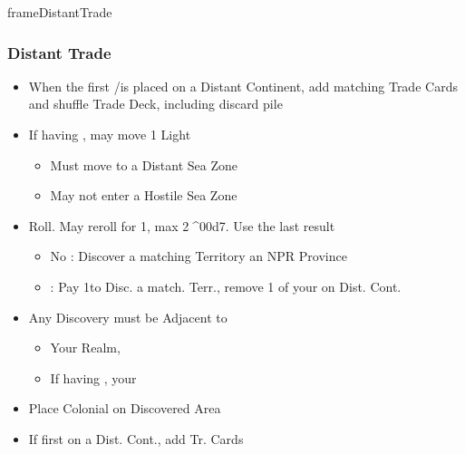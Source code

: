 \documentclass[10pt]{article}
\newlength{\fhDistantTrade} \setlength\fhDistantTrade{4\baselineskip}
\begin{document}
\begin{dynamiccontents*}{frameDistantTrade}\begin{eubox}{\fhDistantTrade}
	\subsubsection*{Distant Trade }
	\begin{itemize}
		\item When the first \claim/\dnpr is placed on a Distant Continent, add matching Trade Cards and shuffle Trade Deck, including discard pile
	\end{itemize}
\end{eubox}\end{dynamiccontents*}

\begin{itemize}
	\item If having , may move 1 Light \ship
	\begin{itemize}
		\item Must move to a Distant Sea Zone
		\item May not enter a Hostile Sea Zone
	\end{itemize}
	\item Roll. May reroll for 1\diplopower, max 2^^^^00d7. Use the last result
	\begin{itemize}
		\item No \skull: Discover a matching Territory  an NPR Province  \town {} \vassal
		\item \skull: Pay 1\diplopower to Disc. a match. Terr.,  remove 1 of your \ships on Dist. Cont.
	\end{itemize}
	\item Any Discovery must be Adjacent to
	\begin{itemize}
		\item Your Realm, 
		\item If having , your \ship
	\end{itemize}
	\item Place Colonial \claim on Discovered Area
	\item If first \claim on a Dist. Cont., add Tr. Cards
\end{itemize}
\end{document}
